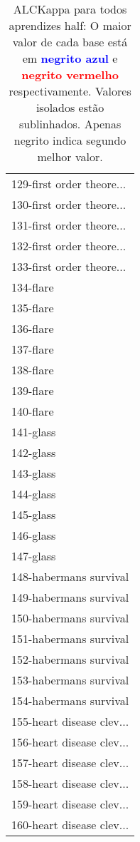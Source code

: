 \begin{table}[h]
\caption{ALCKappa para todos aprendizes half: O maior valor de cada base está em \textcolor{blue}{\textbf{negrito azul}} e \textcolor{red}{\textbf{negrito vermelho}} respectivamente. Valores isolados estão sublinhados. Apenas negrito indica segundo melhor valor.}
\begin{center}\begin{tabular}{l}
 & \\ \hline 129-first order theore... &  \\
130-first order theore... &  \\
131-first order theore... &  \\
132-first order theore... &  \\
133-first order theore... &  \\
134-flare &  \\
135-flare &  \\ \hline
136-flare &  \\
137-flare &  \\
138-flare &  \\
139-flare &  \\
140-flare &  \\
141-glass &  \\
142-glass &  \\ \hline
143-glass &  \\
144-glass &  \\
145-glass &  \\
146-glass &  \\
147-glass &  \\
148-habermans survival &  \\
149-habermans survival &  \\ \hline
150-habermans survival &  \\
151-habermans survival &  \\
152-habermans survival &  \\
153-habermans survival &  \\
154-habermans survival &  \\
155-heart disease clev... &  \\
156-heart disease clev... &  \\ \hline
157-heart disease clev... &  \\
158-heart disease clev... &  \\
159-heart disease clev... &  \\
160-heart disease clev... &  \\\end{tabular}\label{stratsALCKappa4AllReduxb}
\end{center}
\end{table}
